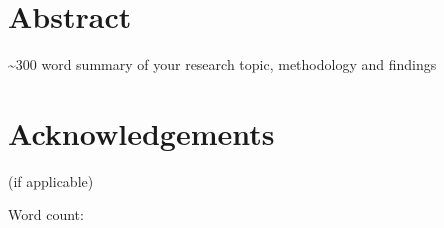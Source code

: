 \section*{Abstract}

\begin{center}
    \textasciitilde300 word summary of your research topic, methodology and findings
\end{center}

\vfill

\section*{Acknowledgements}

(if applicable)

\vspace{2cm}

\noindent Word count:
